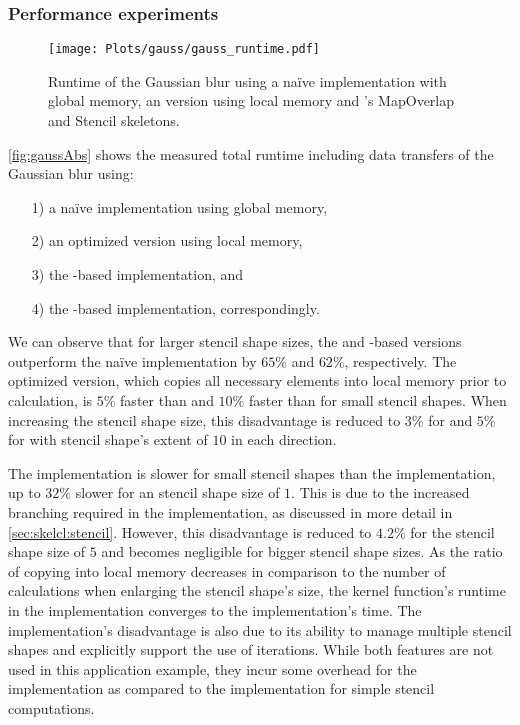 \subsubsection*{Performance experiments}

\begin{figure}[tbp]
	\centering
	\texttt{[image: Plots/gauss/gauss\_runtime.pdf]}
	\caption[Runtime of the Gaussian blur using different implementations.]%
          {Runtime of the Gaussian blur using a na{\"i}ve \OpenCL implementation with global memory, an \OpenCL version using local memory and \SkelCL's MapOverlap and Stencil skeletons.}
	\label{fig:gaussAbs}
\end{figure} 

\autoref{fig:gaussAbs} shows the measured total runtime including data transfers of the Gaussian blur using:
\begin{itemize}
  \item[1)] a na{\"i}ve \OpenCL implementation using global memory,
  \item[2)] an optimized \OpenCL version using local memory,
  \item[3)] the -based implementation, and
  \item[4)] the -based implementation, correspondingly.
\end{itemize}
We can observe that for larger stencil shape sizes, the  and -based versions outperform the na{\"i}ve \OpenCL implementation by $65\%$ and $62\%$, respectively.
The optimized \OpenCL version, which copies all necessary elements into local memory prior to calculation, is $5\%$ faster than  and $10\%$ faster than  for small stencil shapes.
When increasing the stencil shape size, this disadvantage is reduced to $3\%$ for  and $5\%$ for  with stencil shape's extent of $10$ in each direction.

The  implementation is slower for small stencil shapes than the  implementation, up to $32\%$ slower for an stencil shape size of $1$.
This is due to the increased branching required in the  implementation, as discussed in more detail in \autoref{sec:skelcl:stencil}.
However, this disadvantage is reduced to $4.2\%$ for the stencil shape size of $5$ and becomes negligible for bigger stencil shape sizes.
As the ratio of copying into local memory decreases in comparison to the number of calculations when enlarging the stencil shape's size, the kernel function's runtime in the  implementation  converges to the  implementation's time.
The  implementation's disadvantage is also due to its ability to manage multiple stencil shapes and explicitly support the use of iterations.
While both features are not used in this application example, they incur some overhead for the implementation as compared to the  implementation for simple stencil computations.



